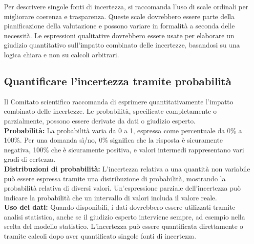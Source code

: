 Per descrivere singole fonti di incertezza, si raccomanda l'uso di scale ordinali per migliorare coerenza e trasparenza. Queste scale dovrebbero essere parte della pianificazione della valutazione e possono variare in formalità a seconda delle necessità. Le espressioni qualitative dovrebbero essere usate per elaborare un giudizio quantitativo sull'impatto combinato delle incertezze, basandosi su una logica chiara e non su calcoli arbitrari.\\

\subsection{Quantificare l'incertezza tramite probabilità}

Il Comitato scientifico raccomanda di esprimere quantitativamente l'impatto combinato delle incertezze. Le probabilità, specificate completamente o parzialmente, possono essere derivate da dati o giudizio esperto.\\

\textbf{Probabilità:} La probabilità varia da 0 a 1, espressa come percentuale da 0\% a 100\%. Per una domanda sì/no, 0\% significa che la risposta è sicuramente negativa, 100\% che è sicuramente positiva, e valori intermedi rappresentano vari gradi di certezza.\\

\textbf{Distribuzioni di probabilità:} L'incertezza relativa a una quantità non variabile può essere espressa tramite una distribuzione di probabilità, mostrando la probabilità relativa di diversi valori. Un'espressione parziale dell'incertezza può indicare la probabilità che un intervallo di valori includa il valore reale.\\

\textbf{Uso dei dati:} Quando disponibili, i dati dovrebbero essere utilizzati tramite analisi statistica, anche se il giudizio esperto interviene sempre, ad esempio nella scelta del modello  statistico. L'incertezza può essere quantificata direttamente o tramite calcoli dopo aver quantificato singole fonti di incertezza.\\
